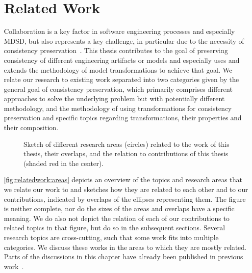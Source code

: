 \chapter{Related Work
}
\label{chap:relatedwork}

Collaboration is a key factor in software engineering processes and especially \gls{MDSD}, but also represents a key challenge, in particular due to the necessity of consistency preservation~\cite{franzago2018mdseChallenges-TSE}.
This thesis contributes to the goal of preserving consistency of different engineering artifacts or models and especially uses and extends the methodology of model transformations to achieve that goal.
We relate our research to existing work separated into two categories given by the general goal of consistency preservation, which primarily comprises different approaches to solve the underlying problem but with potentially different methodology, and the methodology of using transformations for consistency preservation and specific topics regarding transformations, their properties and their composition.

\begin{figure}
    \centering
    
    \caption[Overlaps of related research areas]{Sketch of different research areas (circles) related to the work of this thesis, their overlaps, and the relation to contributions of this thesis (shaded red in the center).}
    \label{fig:relatedwork:areas}
\end{figure}

\autoref{fig:relatedwork:areas} depicts an overview of the topics and research areas that we relate our work to and sketches how they are related to each other and to our contributions, indicated by overlaps of the ellipses representing them.
The figure is neither complete, nor do the sizes of the areas and overlaps have a specific meaning.
We do also not depict the relation of each of our contributions to related topics in that figure, but do so in the subsequent sections.
Several research topics are cross-cutting, such that some work fits into multiple categories.
We discuss these works in the areas to which they are mostly related.
Parts of the discussions in this chapter have already been published in previous work~.


